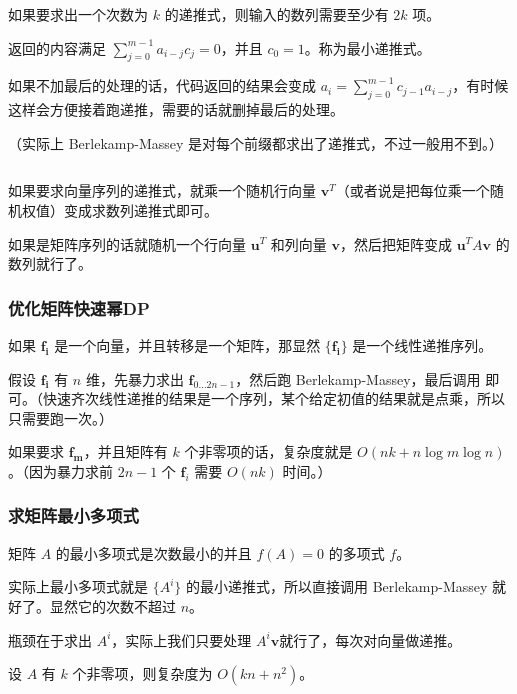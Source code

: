 如果要求出一个次数为 $k$ 的递推式，则输入的数列需要至少有 $2k$ 项。

返回的内容满足 $\sum_{j = 0} ^ {m - 1} a_{i - j} c_j = 0$，并且 $c_0 = 1$。称为最小递推式。

如果不加最后的处理的话，代码返回的结果会变成 $a_i = \sum_{j = 0} ^ {m - 1} c_{j - 1} a_{i - j}$，有时候这样会方便接着跑递推，需要的话就删掉最后的处理。

（实际上 Berlekamp-Massey 是对每个前缀都求出了递推式，不过一般用不到。）

\inputminted{cpp}{../src/math/Berlekamp-Massey.cpp}

如果要求向量序列的递推式，就乘一个随机行向量 $\boldsymbol{v} ^ T$（或者说是把每位乘一个随机权值）变成求数列递推式即可。

如果是矩阵序列的话就随机一个行向量 $\boldsymbol{u} ^ T$ 和列向量 $\boldsymbol{v}$，然后把矩阵变成 $\boldsymbol{u} ^ T A \boldsymbol{v}$ 的数列就行了。

\label{BerlekampMasseyApplication}

\subsubsection{优化矩阵快速幂DP}

	如果 $\boldsymbol{f_i}$ 是一个向量，并且转移是一个矩阵，那显然 $\{\boldsymbol{f_i}\}$ 是一个线性递推序列。

	假设 $\boldsymbol{f_i}$ 有 $n$ 维，先暴力求出 $\boldsymbol{f}_{0 \dots 2n - 1}$，然后跑 Berlekamp-Massey，最后调用  即可。（快速齐次线性递推的结果是一个序列，某个给定初值的结果就是点乘，所以只需要跑一次。）

	如果要求 $\boldsymbol{f_m}$，并且矩阵有 $k$ 个非零项的话，复杂度就是 $O(nk + n\log m\log n)$。（因为暴力求前 $2n-1$ 个 $\boldsymbol{f}_i$ 需要 $O(nk)$ 时间。）

\subsubsection{求矩阵最小多项式}

	矩阵 $A$ 的最小多项式是次数最小的并且 $f(A) = 0$ 的多项式 $f$。

	实际上最小多项式就是 $\{A^i\}$ 的最小递推式，所以直接调用 Berlekamp-Massey 就好了。显然它的次数不超过 $n$。

	瓶颈在于求出 $A^i$，实际上我们只要处理 $A^i \boldsymbol{v}$就行了，每次对向量做递推。
	
	设 $A$ 有 $k$ 个非零项，则复杂度为 $O(kn + n ^ 2)$。

